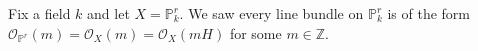 Fix a field $k$ and let $X = \mathbb{P}^r_k$. We saw every line bundle on $\mathbb{P}^r_k$
is of the form $\mathcal{O}_{\mathbb{P}^r}(m) = \mathcal{O}_X(m) = \mathcal{O}_X(mH)$
for some $m \in \mathbb{Z}$.
